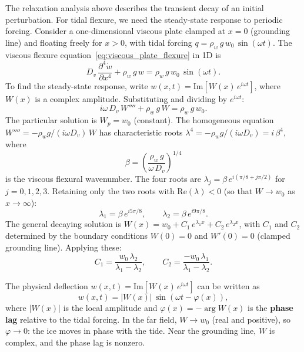 \documentclass[11pt]{article}
\begin{document}
The relaxation analysis above describes the transient decay of an initial perturbation.  For tidal flexure, we need the steady-state response to periodic forcing.  Consider a one-dimensional viscous plate clamped at $x = 0$ (grounding line) and floating freely for $x > 0$, with tidal forcing $q = \rho_w\,g\,w_0\,\sin(\omega t)$.  The viscous flexure equation~\eqref{eq:viscous_plate_flexure} in 1D is
\begin{equation}
  D_v\,\frac{\partial^4 \dot{w}}{\partial x^4} + \rho_w\,g\,w = \rho_w\,g\,w_0\,\sin(\omega t).
  \label{eq:viscous_tidal_1d}
\end{equation}
To find the steady-state response, write $w(x,t) = \mathrm{Im}\!\left[W(x)\,e^{i\omega t}\right]$, where $W(x)$ is a complex amplitude.  Substituting and dividing by $e^{i\omega t}$:
\begin{equation}
  i\omega\,D_v\,W'''' + \rho_w\,g\,W = \rho_w\,g\,w_0.
  \label{eq:viscous_complex_ode}
\end{equation}
The particular solution is $W_p = w_0$ (constant).  The homogeneous equation $W'''' = -\rho_w g/(i\omega D_v)\,W$ has characteristic roots $\lambda^4 = -\rho_w g/(i\omega D_v) = i\,\beta^4$, where
\begin{equation}
  \beta = \left(\frac{\rho_w\,g}{\omega\,D_v}\right)^{1/4}
  \label{eq:beta_viscous}
\end{equation}
is the viscous flexural wavenumber.  The four roots are $\lambda_j = \beta\,e^{i(\pi/8 + j\pi/2)}$ for $j = 0, 1, 2, 3$.  Retaining only the two roots with $\mathrm{Re}(\lambda) < 0$ (so that $W \to w_0$ as $x \to \infty$):
\begin{equation}
  \lambda_1 = \beta\,e^{i5\pi/8}, \qquad \lambda_2 = \beta\,e^{i9\pi/8}.
  \label{eq:viscous_roots}
\end{equation}
The general decaying solution is $W(x) = w_0 + C_1\,e^{\lambda_1 x} + C_2\,e^{\lambda_2 x}$, with $C_1$ and $C_2$ determined by the boundary conditions $W(0) = 0$ and $W'(0) = 0$ (clamped grounding line).  Applying these:
\begin{equation}
  C_1 = \frac{w_0\,\lambda_2}{\lambda_1 - \lambda_2}, \qquad C_2 = \frac{-w_0\,\lambda_1}{\lambda_1 - \lambda_2}.
  \label{eq:viscous_coeffs}
\end{equation}

The physical deflection $w(x,t) = \mathrm{Im}[W(x)\,e^{i\omega t}]$ can be written as
\begin{equation}
  w(x,t) = |W(x)|\,\sin\!\left(\omega t - \varphi(x)\right),
  \label{eq:viscous_amplitude_phase}
\end{equation}
where $|W(x)|$ is the local amplitude and $\varphi(x) = -\arg W(x)$ is the \textbf{phase lag} relative to the tidal forcing.  In the far field, $W \to w_0$ (real and positive), so $\varphi \to 0$: the ice moves in phase with the tide.  Near the grounding line, $W$ is complex, and the phase lag is nonzero.
\end{document}
